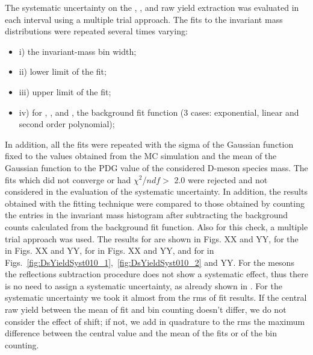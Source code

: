 The systematic uncertainty on the \Dplus, \Dzero, \Dstar and \Dsubs raw yield extraction was evaluated in each \pt interval using a multiple trial approach. The fits to the invariant mass distributions were repeated several times varying:
\begin{itemize}
	\item i) the invariant-mass bin width;
	\item ii) lower limit of the fit;
	\item iii)  upper  limit  of  the  fit;
	\item iv) for \Dzero, \Dplus, and \Dsubs, the background fit function (3 cases: exponential, linear and second order polynomial);
\end{itemize}   
In addition, all the fits were repeated with the sigma of the Gaussian function fixed to the values obtained from the MC simulation and the mean of the Gaussian function to the PDG value of the considered D-meson species mass. The fits which did not converge or had $\chi^2$/$ndf> $ 2.0 were rejected and not considered in the evaluation of the systematic uncertainty.  In addition, the results obtained with the fitting technique were compared to those obtained by counting the entries in the invariant mass histogram after subtracting the background counts calculated from the background fit function. Also for this check, a multiple trial approach was used. 
The results for \Dplus are shown in Figs. XX and YY, for the \Dzero in Figs. XX and YY, for \Dstar in Figs. XX and YY, and for \Dsubs in Figs.~\ref{fig:DsYieldSyst010_1},~\ref{fig:DsYieldSyst010_2} and YY.
For the \Dzero mesons the reflections subtraction procedure does not show a systematic effect, thus there is no need to assign a systematic uncertainty, as already shown in \cite{Bruna:2016mgn}. For the systematic uncertainty we took it almost from the rms of fit results. If the central raw yield between the mean of fit and bin counting doesn't differ, we do not consider the effect of shift; if not, we add in quadrature to the rms the maximum difference between the central value and the mean of the fits or of the bin counting.



